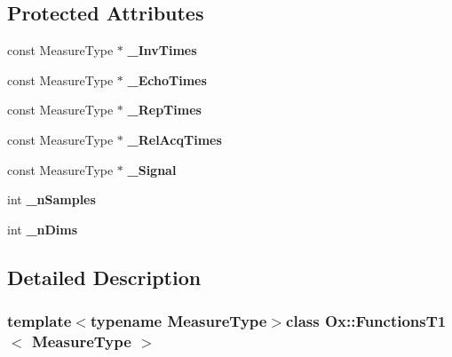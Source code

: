 \subsection*{Protected Attributes}
\begin{DoxyCompactItemize}
\item 
\hypertarget{class_ox_1_1_functions_t1_a4e92c3f06b7ef0327d6625a662db4d1c}{const Measure\-Type $\ast$ {\bfseries \-\_\-\-Inv\-Times}}\label{class_ox_1_1_functions_t1_a4e92c3f06b7ef0327d6625a662db4d1c}

\item 
\hypertarget{class_ox_1_1_functions_t1_adaf6b5335e0014ad37c007a24f150343}{const Measure\-Type $\ast$ {\bfseries \-\_\-\-Echo\-Times}}\label{class_ox_1_1_functions_t1_adaf6b5335e0014ad37c007a24f150343}

\item 
\hypertarget{class_ox_1_1_functions_t1_a719873f2f02b6dcf0ae100f9c9a6884f}{const Measure\-Type $\ast$ {\bfseries \-\_\-\-Rep\-Times}}\label{class_ox_1_1_functions_t1_a719873f2f02b6dcf0ae100f9c9a6884f}

\item 
\hypertarget{class_ox_1_1_functions_t1_abfbc38cf7ea0bbc1b52f48a75f281246}{const Measure\-Type $\ast$ {\bfseries \-\_\-\-Rel\-Acq\-Times}}\label{class_ox_1_1_functions_t1_abfbc38cf7ea0bbc1b52f48a75f281246}

\item 
\hypertarget{class_ox_1_1_functions_t1_a8f87abd26c39fddd3e2b0085e97c6571}{const Measure\-Type $\ast$ {\bfseries \-\_\-\-Signal}}\label{class_ox_1_1_functions_t1_a8f87abd26c39fddd3e2b0085e97c6571}

\item 
\hypertarget{class_ox_1_1_functions_t1_a32038248ea53c223d9d99cd9cee36378}{int {\bfseries \-\_\-n\-Samples}}\label{class_ox_1_1_functions_t1_a32038248ea53c223d9d99cd9cee36378}

\item 
\hypertarget{class_ox_1_1_functions_t1_a4d42b89cb62d20c80e3210b17a692ed1}{int {\bfseries \-\_\-n\-Dims}}\label{class_ox_1_1_functions_t1_a4d42b89cb62d20c80e3210b17a692ed1}

\end{DoxyCompactItemize}


\subsection{Detailed Description}
\subsubsection*{template$<$typename Measure\-Type$>$class Ox\-::\-Functions\-T1$<$ Measure\-Type $>$}

